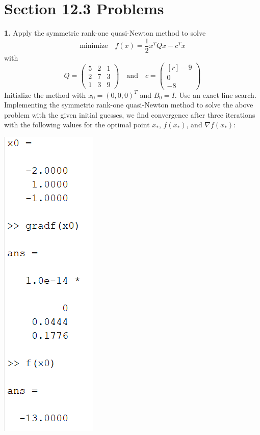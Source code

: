 \documentclass{article}
\newcommand{\minimize}[0]{\text{minimize}}
\begin{document}
\section*{Section 12.3 Problems}
\textbf{1.} Apply the symmetric rank-one quasi-Newton method to solve
\[\minimize \hspace{1em} f(x) = \frac{1}{2}x^TQx - c^Tx\]
with
\[Q = \begin{pmatrix}
    5 & 2 & 1\\
    2 & 7 & 3\\
    1 & 3 & 9
\end{pmatrix}
\hspace{1em} \text{and} \hspace{1em}
c = \begin{pmatrix*}[r]
    -9\\
    0\\
    -8
\end{pmatrix*}\]
Initialize the method with $x_0 = (0,0,0)^T$ and $B_0 = I$. Use an exact line search.
\newline\newline
Implementing the symmetric rank-one quasi-Newton method to solve the above problem with the given initial guesses, we find convergence after three iterations with the following values for the optimal point $x_*$, $f(x_*)$, and $\nabla f(x_*)$:
\begin{center}
    \includegraphics[scale = 0.9]{r1symVALS}
\end{center}
\end{document}
